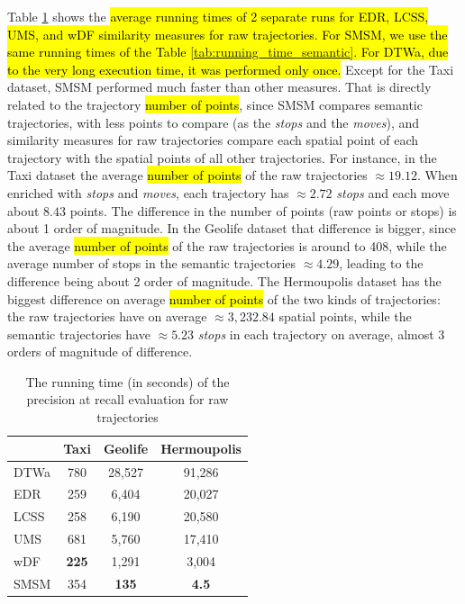 Table \ref{tab:running_time_raw} shows the \hl{average running times of 2 separate runs for EDR, LCSS, UMS, and wDF similarity measures for raw trajectories. For SMSM, we use the same running times of the Table {\ref{tab:running_time_semantic}}. For DTWa, due to the very long execution time, it was performed only once.} Except for the Taxi dataset, SMSM performed much faster than other measures. That is directly related to the trajectory \hl{number of points}, since SMSM compares semantic trajectories, with less points to compare (as the \emph{stops} and the \emph{moves}), and similarity measures for raw trajectories compare each spatial point of each trajectory with the spatial points of all other trajectories. For instance, in the Taxi dataset the average \hl{number of points} of the raw trajectories $\approx 19.12$. When enriched with \emph{stops} and \emph{moves}, each trajectory has $\approx 2.72$ \emph{stops} and each move about $8.43$ points. The difference in the number of points (raw points or stops) is about 1 order of magnitude. In the Geolife dataset that difference is bigger, since the average \hl{number of points} of the raw trajectories is around to 408, while the average number of stops in the semantic trajectories $\approx 4.29$, leading to the difference being about 2 order of magnitude. The Hermoupolis dataset has the biggest difference on average \hl{number of points} of the two kinds of trajectories: the raw trajectories have on average $\approx 3,232.84$ spatial points, while the semantic trajectories have $\approx 5.23$ \emph{stops} in each trajectory on average, almost 3 orders of magnitude of difference.

\begin{table}[ht!]
  \scriptsize
  \centering
  \begin{tabular}{|l|c|c|c|}
  \hline
& Taxi & Geolife & Hermoupolis\\
  \hline
DTWa	& 780	        & 28,527        & 91,286\\
EDR		& 259	        & 6,404	        & 20,027\\
LCSS	& 258	        & 6,190	        & 20,580\\
UMS		& 681	        & 5,760	        & 17,410\\
wDF		& \textbf{225}	& 1,291	        & 3,004\\
SMSM    & 354           & \textbf{135} & \textbf{4.5}\\
    \hline
  \end{tabular}
  \caption{The running time (in seconds) of the precision at recall evaluation for raw trajectories}
  \label{tab:running_time_raw}
\end{table}

